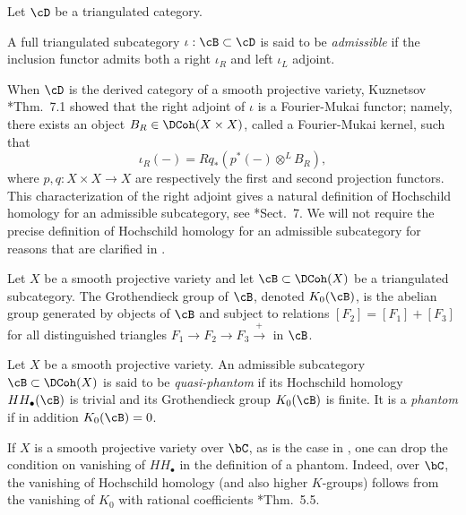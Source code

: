 Let $\cD$ be a triangulated category.

\begin{defn}
A full triangulated subcategory $\iota : \cB \subset \cD$ is said to be \emph{admissible} if the inclusion functor admits both a right $\iota_R$ and left $\iota_L$ adjoint. 
\end{defn}


When $\cD$ is the derived category of a smooth projective variety, Kuznetsov \cite{K11}*{Thm.~7.1} showed that the right adjoint of $\iota$ is a Fourier-Mukai functor; namely, there exists an object $B_R \in \DCoh(X \times X)$, called a Fourier-Mukai kernel, such that 
\[
    \iota_R (-) = Rq_\ast \left( p^\ast (-) \otimes ^L B_R \right) ,
\]
where $p,q: X\times X \to X$ are respectively the first and second projection functors. This characterization of the right adjoint gives a natural definition of Hochschild homology for an admissible subcategory, see \cite{K11}*{Sect.~7}. We will not require the precise definition of Hochschild homology for an admissible subcategory for reasons that are clarified in .

\begin{defn}
Let $X$ be a smooth projective variety and let $\cB \subset \DCoh(X)$ be a triangulated subcategory. The Grothendieck group of $\cB$, denoted $K_0(\cB)$, is the abelian group generated by objects of $\cB$ and subject to relations $[F_2] = [F_1] + [F_3]$ for all distinguished triangles $ F_1 \to F_2 \to F_3 \xrightarrow{+   }$ in $\cB$.
\end{defn}

\begin{defn}
Let $X$ be a smooth projective variety. An admissible subcategory $\cB \subset \DCoh(X)$ is said to be \emph{quasi-phantom} if its Hochschild homology  $HH_{\bullet}(\cB)$ is trivial and its Grothendieck group $K_0(\cB)$ is finite. It is a \emph{phantom} if in addition $K_0(\cB) = 0$. 
\end{defn}

\begin{rem} \label{R:rational_K_0_controls_K_motive}
If $X$ is a smooth projective variety over $\bC$, as is the case in , one can drop the condition on vanishing of $HH_\bullet$ in the definition of a phantom. Indeed, over $\bC$, the vanishing of Hochschild homology (and also higher $K$-groups) follows from the vanishing of $K_0$ with rational coefficients \cite{GO13}*{Thm.~5.5}.
\end{rem}

